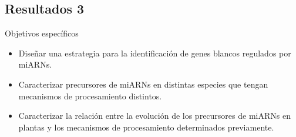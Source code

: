 \documentclass{beamer}
\begin{document}

\subsection{Resultados 3}

\begin{frame}{Objetivos específicos}
		\pause
		\begin{itemize}
            \item<-1> Diseñar una estrategia para la identificación de genes blancos regulados por miARNs.
			\item<-1> Caracterizar precursores de miARNs en distintas especies que tengan mecanismos de procesamiento distintos.
			\item<-2> Caracterizar la relación entre la evolución de los precursores de miARNs en plantas y los mecanismos de procesamiento determinados previamente.
        \end{itemize}
\end{frame}
\end{document}
